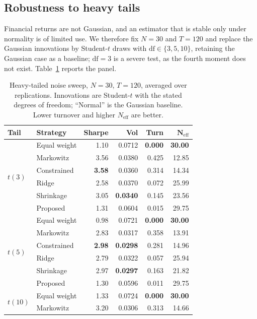 \documentclass[11pt]{article}
\newcommand{\Neff}{N_{\mathrm{eff}}}
\begin{document}
\subsection{Robustness to heavy tails}
\label{sec:noise}
Financial returns are not Gaussian, and an estimator that is stable only under
normality is of limited use. We therefore fix $N=30$ and $T=120$ and replace the
Gaussian innovations by Student-$t$ draws with $\mathrm{df}\in\{3,5,10\}$,
retaining the Gaussian case as a baseline; $\mathrm{df}=3$ is a severe test, as
the fourth moment does not exist. Table~\ref{tab:noise} reports the panel.

\begin{table}[htbp]
\centering
\caption{Heavy-tailed noise sweep, $N=30$, $T=120$, averaged over replications.
  Innovations are Student-$t$ with the stated degrees of freedom; ``Normal'' is
  the Gaussian baseline. Lower turnover and higher $\Neff$ are better.}
\label{tab:noise}
\small
\begin{tabular}{llrrrr}
\toprule
\textbf{Tail} & \textbf{Strategy} & \textbf{Sharpe} & \textbf{Vol} & \textbf{Turn} & $\boldsymbol{\Neff}$ \\
\midrule
\multirow{6}{*}{$t(3)$}
 & Equal weight & 1.10 & 0.0712 & \textbf{0.000} & \textbf{30.00} \\
 & Markowitz    & 3.56 & 0.0380 & 0.425 & 12.85 \\
 & Constrained  & \textbf{3.58} & 0.0360 & 0.314 & 14.34 \\
 & Ridge        & 2.58 & 0.0370 & 0.072 & 25.99 \\
 & Shrinkage    & 3.05 & \textbf{0.0340} & 0.145 & 23.56 \\
 & Proposed     & 1.31 & 0.0604 & 0.015 & 29.75 \\
\midrule
\multirow{6}{*}{$t(5)$}
 & Equal weight & 0.98 & 0.0721 & \textbf{0.000} & \textbf{30.00} \\
 & Markowitz    & 2.83 & 0.0317 & 0.358 & 13.91 \\
 & Constrained  & \textbf{2.98} & \textbf{0.0298} & 0.281 & 14.96 \\
 & Ridge        & 2.79 & 0.0322 & 0.057 & 25.94 \\
 & Shrinkage    & 2.97 & \textbf{0.0297} & 0.163 & 21.82 \\
 & Proposed     & 1.30 & 0.0596 & 0.011 & 29.75 \\
\midrule
\multirow{6}{*}{$t(10)$}
 & Equal weight & 1.33 & 0.0724 & \textbf{0.000} & \textbf{30.00} \\
 & Markowitz    & 3.20 & 0.0306 & 0.313 & 14.66 \\

\end{tabular}
\end{table}
\end{document}
